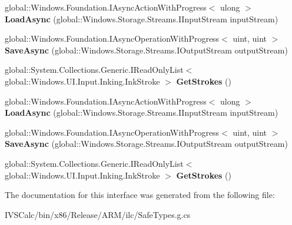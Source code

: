 \begin{DoxyCompactItemize}
global\+::\+Windows.\+Foundation.\+I\+Async\+Action\+With\+Progress$<$ ulong $>$ {\bfseries Load\+Async} (global\+::\+Windows.\+Storage.\+Streams.\+I\+Input\+Stream input\+Stream)
\item 
\mbox{\label{interface_windows_1_1_u_i_1_1_input_1_1_inking_1_1_i_ink_stroke_container_a3b12ede6927ca0d6c499746700400fcf}} 
global\+::\+Windows.\+Foundation.\+I\+Async\+Operation\+With\+Progress$<$ uint, uint $>$ {\bfseries Save\+Async} (global\+::\+Windows.\+Storage.\+Streams.\+I\+Output\+Stream output\+Stream)
\item 
\mbox{\label{interface_windows_1_1_u_i_1_1_input_1_1_inking_1_1_i_ink_stroke_container_a71ca3cf2eb98b4245542df72cce510fb}} 
global\+::\+System.\+Collections.\+Generic.\+I\+Read\+Only\+List$<$ global\+::\+Windows.\+U\+I.\+Input.\+Inking.\+Ink\+Stroke $>$ {\bfseries Get\+Strokes} ()
\item 
\mbox{\label{interface_windows_1_1_u_i_1_1_input_1_1_inking_1_1_i_ink_stroke_container_a9d69a26a67513752e224a312eed08d6a}} 
global\+::\+Windows.\+Foundation.\+I\+Async\+Action\+With\+Progress$<$ ulong $>$ {\bfseries Load\+Async} (global\+::\+Windows.\+Storage.\+Streams.\+I\+Input\+Stream input\+Stream)
\item 
\mbox{\label{interface_windows_1_1_u_i_1_1_input_1_1_inking_1_1_i_ink_stroke_container_a3b12ede6927ca0d6c499746700400fcf}} 
global\+::\+Windows.\+Foundation.\+I\+Async\+Operation\+With\+Progress$<$ uint, uint $>$ {\bfseries Save\+Async} (global\+::\+Windows.\+Storage.\+Streams.\+I\+Output\+Stream output\+Stream)
\item 
\mbox{\label{interface_windows_1_1_u_i_1_1_input_1_1_inking_1_1_i_ink_stroke_container_a71ca3cf2eb98b4245542df72cce510fb}} 
global\+::\+System.\+Collections.\+Generic.\+I\+Read\+Only\+List$<$ global\+::\+Windows.\+U\+I.\+Input.\+Inking.\+Ink\+Stroke $>$ {\bfseries Get\+Strokes} ()
\end{DoxyCompactItemize}


The documentation for this interface was generated from the following file\+:\begin{DoxyCompactItemize}
\item 
I\+V\+S\+Calc/bin/x86/\+Release/\+A\+R\+M/ilc/Safe\+Types.\+g.\+cs\end{DoxyCompactItemize}
